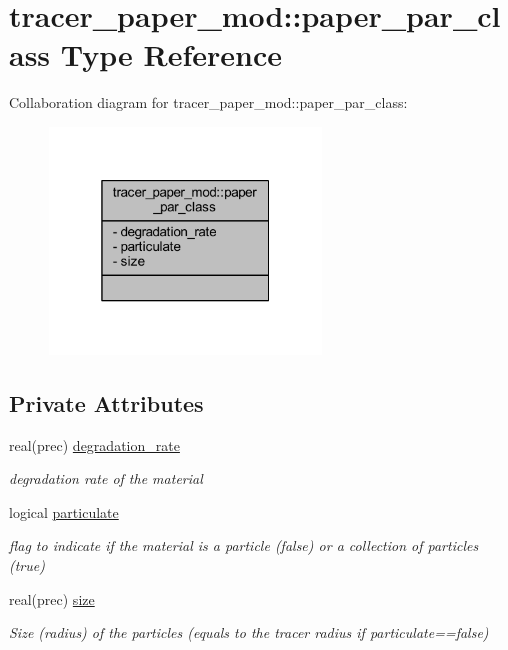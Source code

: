 \hypertarget{structtracer__paper__mod_1_1paper__par__class}{}\section{tracer\+\_\+paper\+\_\+mod\+:\+:paper\+\_\+par\+\_\+class Type Reference}
\label{structtracer__paper__mod_1_1paper__par__class}


Collaboration diagram for tracer\+\_\+paper\+\_\+mod\+:\+:paper\+\_\+par\+\_\+class\+:
\nopagebreak
\begin{figure}[H]
\begin{center}
\leavevmode
\includegraphics[width=205pt]{structtracer__paper__mod_1_1paper__par__class__coll__graph}
\end{center}
\end{figure}
\subsection*{Private Attributes}
\begin{DoxyCompactItemize}
\item 
real(prec) \mbox{\hyperlink{structtracer__paper__mod_1_1paper__par__class_ac9893368ff4ec076f4604d749c2bb391}{degradation\+\_\+rate}}
\begin{DoxyCompactList}\small\item\em degradation rate of the material \end{DoxyCompactList}\item 
logical \mbox{\hyperlink{structtracer__paper__mod_1_1paper__par__class_a794fb1c69237803f68cb68143273242c}{particulate}}
\begin{DoxyCompactList}\small\item\em flag to indicate if the material is a particle (false) or a collection of particles (true) \end{DoxyCompactList}\item 
real(prec) \mbox{\hyperlink{structtracer__paper__mod_1_1paper__par__class_aeb0b4d046983cd2f631822e80e1600c4}{size}}
\begin{DoxyCompactList}\small\item\em Size (radius) of the particles (equals to the tracer radius if particulate==false) \end{DoxyCompactList}\end{DoxyCompactItemize}


